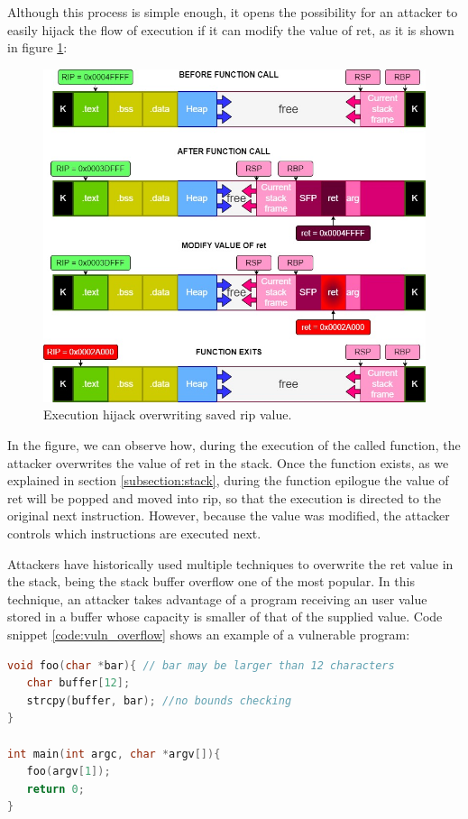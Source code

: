 \documentclass[12pt]{report} %
\begin{document}
Although this process is simple enough, it opens the possibility for an attacker to easily hijack the flow of execution if it can modify the value of ret, as it is shown in figure \ref{fig:stack_ret_hij_simple}:
\begin{figure}[H]
	\centering
	\includegraphics[width=15cm]{stack_ret_hij_simple.jpg}
	\caption{Execution hijack overwriting saved rip value.}
	\label{fig:stack_ret_hij_simple}
\end{figure}

In the figure, we can observe how, during the execution of the called function, the attacker overwrites the value of ret in the stack. Once the function exists, as we explained in section \ref{subsection:stack}, during the function epilogue the value of ret will be popped and moved into rip, so that the execution is directed to the original next instruction. However, because the value was modified, the attacker controls which instructions are executed next.

Attackers have historically used multiple techniques to overwrite the ret value in the stack, being the stack buffer overflow one of the most popular. In this technique, an attacker takes advantage of a program receiving an user value stored in a buffer whose capacity is smaller of that of the supplied value. Code snippet \ref{code:vuln_overflow} shows an example of a vulnerable program:

\begin{lstlisting}[language=C, caption={Program vulnerable to buffer overflow.}, label={code:vuln_overflow}]
void foo(char *bar){ // bar may be larger than 12 characters
   char buffer[12];
   strcpy(buffer, bar); //no bounds checking 
}

int main(int argc, char *argv[]){
   foo(argv[1]);
   return 0;
}
\end{lstlisting}
\end{document}

